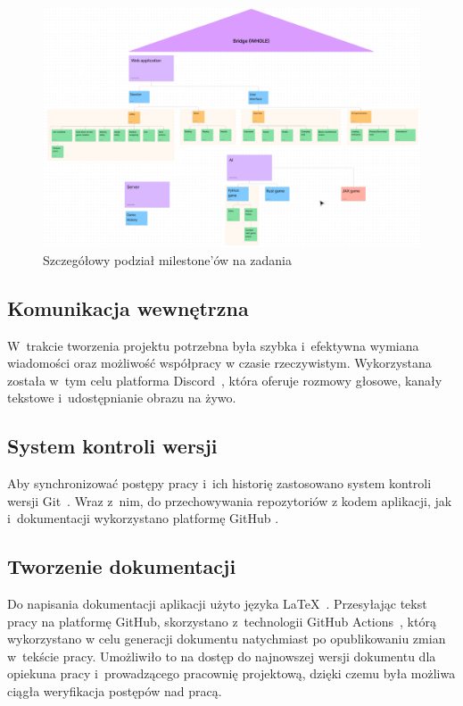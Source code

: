 \begin{figure}[h!]
  \centering
  \includegraphics[width=\textwidth]{img/schematy/milestones.png}
  \caption{Szczegółowy podział milestone'ów na zadania}
\end{figure}

\FloatBarrier


\subsection{Komunikacja wewnętrzna}

W~trakcie tworzenia projektu potrzebna była szybka i~efektywna
wymiana wiadomości oraz możliwość współpracy w czasie rzeczywistym.
Wykorzystana została w~tym celu platforma Discord~\cite{Discord},
która oferuje rozmowy głosowe, kanały tekstowe i~udostępnianie
obrazu na żywo.

\subsection{System kontroli wersji}

Aby synchronizować postępy pracy i~ich historię zastosowano
system kontroli wersji Git~\cite{Git}. Wraz z~nim, do przechowywania
repozytoriów z kodem aplikacji, jak i~dokumentacji wykorzystano
platformę GitHub \cite{Github}.

\subsection{Tworzenie dokumentacji}

Do napisania dokumentacji aplikacji użyto języka \LaTeX~\cite{Latex}.
Przesyłając tekst pracy na platformę GitHub, skorzystano z~technologii
GitHub Actions~\cite{GithubActions}, którą wykorzystano w celu
generacji dokumentu natychmiast po opublikowaniu zmian w~tekście pracy.
Umożliwiło to na dostęp do najnowszej wersji dokumentu dla opiekuna
pracy i~prowadzącego pracownię projektową, dzięki czemu była możliwa
ciągła weryfikacja postępów nad pracą.


